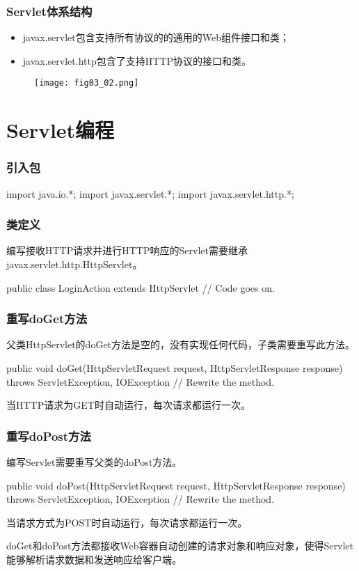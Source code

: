 \begin{frame}
\frametitle{Servlet体系结构} 
\begin{itemize}
\item javax.servlet包含支持所有协议的的通用的Web组件接口和类；
\item javax.servlet.http包含了支持HTTP协议的接口和类。
\end{itemize}
\begin{figure}
\centering
\texttt{[image: fig03\_02.png]}
\end{figure}
\end{frame}

\section{Servlet编程}

\begin{frame}[fragile] %
\frametitle{引入包} 
\begin{javaCode}
import java.io.*;
import javax.servlet.*;
import javax.servlet.http.*;
\end{javaCode}
\end{frame}

\begin{frame}[fragile] %
\frametitle{类定义} 

编写接收HTTP请求并进行HTTP响应的Servlet需要继承javax.servlet.http.HttpServlet。

\begin{javaCode}
public class LoginAction extends HttpServlet {
  // Code goes on.
}
\end{javaCode}
\end{frame}

\begin{frame}[fragile] %
\frametitle{重写doGet方法} 

父类HttpServlet的doGet方法是空的，没有实现任何代码，子类需要重写此方法。

\begin{javaCode}

public void doGet(HttpServletRequest request, HttpServletResponse response) 
throws ServletException, IOException {
  // Rewrite the method.
}
\end{javaCode}

当HTTP请求为GET时自动运行，每次请求都运行一次。
\end{frame}

\begin{frame}[fragile] %
\frametitle{重写doPost方法} 

编写Servlet需要重写父类的doPost方法。

\begin{javaCode}
public void doPost(HttpServletRequest request, HttpServletResponse response)  
throws ServletException, IOException {
  // Rewrite the method.
}
\end{javaCode}
当请求方式为POST时自动运行，每次请求都运行一次。

{\hei\Red doGet和doPost方法都接收Web容器自动创建的请求对象和响应对象，使得Servlet能够解析请求数据和发送响应给客户端。}
\end{frame}


